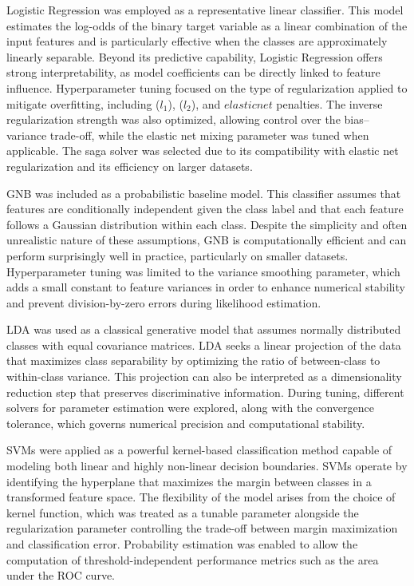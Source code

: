 \documentclass[en]{dimscthesis}
\begin{document}
Logistic Regression was employed as a representative linear classifier. This model estimates the log-odds of the binary target variable as a linear combination of the input features and is particularly effective when the classes are approximately linearly separable. Beyond its predictive capability, Logistic Regression offers strong interpretability, as model coefficients can be directly linked to feature influence. Hyperparameter tuning focused on the type of regularization applied to mitigate overfitting, including ($l_1$), ($l_2$), and $elastic net$ penalties. The inverse regularization strength was also optimized, allowing control over the bias–variance trade-off, while the elastic net mixing parameter was tuned when applicable. The saga solver was selected due to its compatibility with elastic net regularization and its efficiency on larger datasets.

GNB was included as a probabilistic baseline model. This classifier assumes that features are conditionally independent given the class label and that each feature follows a Gaussian distribution within each class. Despite the simplicity and often unrealistic nature of these assumptions, GNB is computationally efficient and can perform surprisingly well in practice, particularly on smaller datasets. Hyperparameter tuning was limited to the variance smoothing parameter, which adds a small constant to feature variances in order to enhance numerical stability and prevent division-by-zero errors during likelihood estimation.

LDA was used as a classical generative model that assumes normally distributed classes with equal covariance matrices. LDA seeks a linear projection of the data that maximizes class separability by optimizing the ratio of between-class to within-class variance. This projection can also be interpreted as a dimensionality reduction step that preserves discriminative information. During tuning, different solvers for parameter estimation were explored, along with the convergence tolerance, which governs numerical precision and computational stability.

SVMs were applied as a powerful kernel-based classification method capable of modeling both linear and highly non-linear decision boundaries. SVMs operate by identifying the hyperplane that maximizes the margin between classes in a transformed feature space. The flexibility of the model arises from the choice of kernel function, which was treated as a tunable parameter alongside the regularization parameter controlling the trade-off between margin maximization and classification error. Probability estimation was enabled to allow the computation of threshold-independent performance metrics such as the area under the ROC curve.
\end{document}

